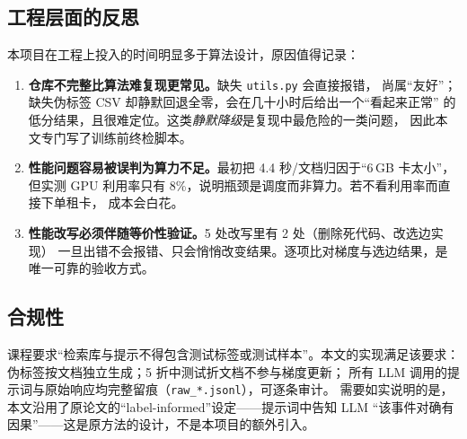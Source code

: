 \subsection{工程层面的反思}

本项目在工程上投入的时间明显多于算法设计，原因值得记录：

\begin{enumerate}
  \item \textbf{仓库不完整比算法难复现更常见。}缺失 \texttt{utils.py} 会直接报错，
        尚属“友好”；缺失伪标签 CSV 却静默回退全零，会在几十小时后给出一个“看起来正常”
        的低分结果，且很难定位。这类\emph{静默降级}是复现中最危险的一类问题，
        因此本文专门写了训练前终检脚本。
  \item \textbf{性能问题容易被误判为算力不足。}最初把 4.4 秒/文档归因于“6\,GB 卡太小”，
        但实测 GPU 利用率只有 8\%，说明瓶颈是调度而非算力。若不看利用率而直接下单租卡，
        成本会白花。
  \item \textbf{性能改写必须伴随等价性验证。}5 处改写里有 2 处（删除死代码、改选边实现）
        一旦出错不会报错、只会悄悄改变结果。逐项比对梯度与选边结果，是唯一可靠的验收方式。
\end{enumerate}

\subsection{合规性}

课程要求“检索库与提示不得包含测试标签或测试样本”。本文的实现满足该要求：
伪标签按文档独立生成；5 折中测试折文档不参与梯度更新；
所有 LLM 调用的提示词与原始响应均完整留痕（\texttt{raw\_*.jsonl}），可逐条审计。
需要如实说明的是，本文沿用了原论文的“label-informed”设定——提示词中告知 LLM
“该事件对确有因果”——这是原方法的设计，不是本项目的额外引入。
